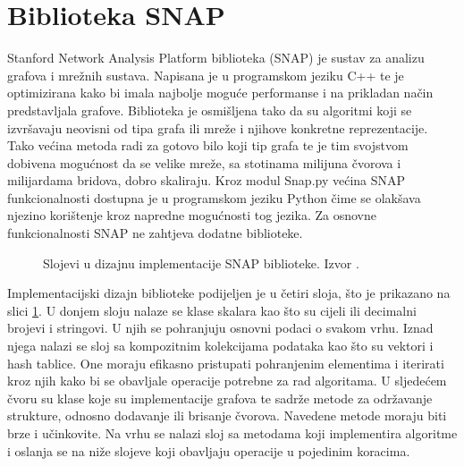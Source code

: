 \documentclass[times, utf8, diplomski]{fer}
\begin{document}
\section{Biblioteka SNAP}
Stanford Network Analysis Platform biblioteka (SNAP) \cite{leskovec2016snap} je sustav za analizu grafova i mrežnih sustava. Napisana je u programskom jeziku C++ te je optimizirana kako bi imala najbolje moguće performanse i na prikladan način predstavljala grafove. Biblioteka je osmišljena tako da su algoritmi koji se izvršavaju neovisni od tipa grafa ili mreže i njihove konkretne reprezentacije. Tako većina metoda radi za gotovo bilo koji tip grafa te je tim svojstvom dobivena mogućnost da se velike mreže, sa stotinama milijuna čvorova i milijardama bridova, dobro skaliraju. Kroz modul Snap.py većina SNAP funkcionalnosti dostupna je u programskom jeziku Python čime se olakšava njezino korištenje kroz napredne mogućnosti tog jezika. Za osnovne funkcionalnosti SNAP ne zahtjeva dodatne biblioteke. 

\begin{figure}
	\caption{Slojevi u dizajnu implementacije SNAP biblioteke. Izvor \cite{leskovec2016snap}.}
	\label{fig:SNAP_design}
\end{figure}

Implementacijski dizajn biblioteke podijeljen je u četiri sloja, što je prikazano na slici \ref{fig:SNAP_design}. U donjem sloju nalaze se klase skalara kao što su cijeli ili decimalni brojevi i stringovi. U njih se pohranjuju osnovni podaci o svakom vrhu. Iznad njega nalazi se sloj sa kompozitnim kolekcijama podataka kao što su vektori i hash tablice. One moraju efikasno pristupati pohranjenim elementima i iterirati kroz njih kako bi se obavljale operacije potrebne za rad algoritama. U sljedećem čvoru su klase koje su implementacije grafova te sadrže metode za održavanje strukture, odnosno dodavanje ili brisanje čvorova. Navedene metode moraju biti brze i učinkovite. Na vrhu se nalazi sloj sa metodama koji implementira algoritme i oslanja se na niže slojeve koji obavljaju operacije u pojedinim koracima.
\end{document}
